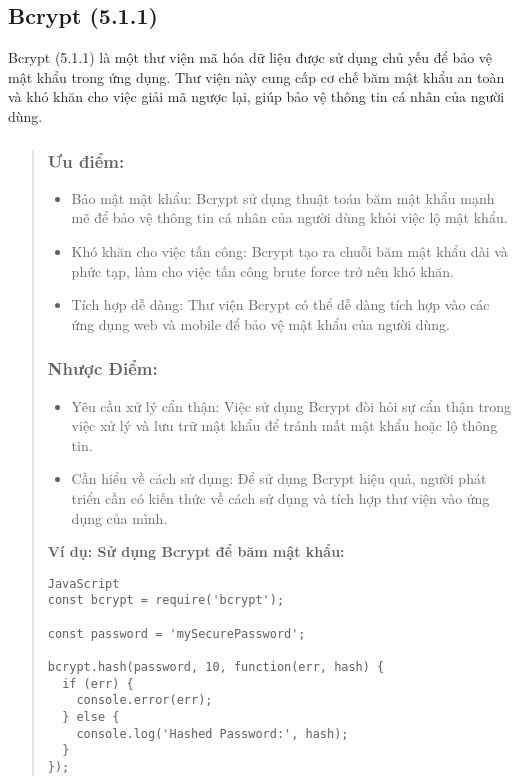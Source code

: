 \subsection{Bcrypt (5.1.1)}
Bcrypt (5.1.1) là một thư viện mã hóa dữ liệu được sử dụng chủ yếu để bảo vệ mật khẩu trong ứng dụng. Thư viện này cung cấp cơ chế băm mật khẩu an toàn và khó khăn cho việc giải mã ngược lại, giúp bảo vệ thông tin cá nhân của người dùng.

\begin{quote}
\subsubsection{Ưu điểm:}
\begin{itemize}
  \item Bảo mật mật khẩu: Bcrypt sử dụng thuật toán băm mật khẩu mạnh mẽ để bảo vệ thông tin cá nhân của người dùng khỏi việc lộ mật khẩu.
  \item Khó khăn cho việc tấn công: Bcrypt tạo ra chuỗi băm mật khẩu dài và phức tạp, làm cho việc tấn công brute force trở nên khó khăn.
  \item Tích hợp dễ dàng: Thư viện Bcrypt có thể dễ dàng tích hợp vào các ứng dụng web và mobile để bảo vệ mật khẩu của người dùng.
\end{itemize}

\subsubsection{Nhược Điểm:}
\begin{itemize}
  \item Yêu cầu xử lý cẩn thận: Việc sử dụng Bcrypt đòi hỏi sự cẩn thận trong việc xử lý và lưu trữ mật khẩu để tránh mất mật khẩu hoặc lộ thông tin.
  \item Cần hiểu về cách sử dụng: Để sử dụng Bcrypt hiệu quả, người phát triển cần có kiến thức về cách sử dụng và tích hợp thư viện vào ứng dụng của mình.
\end{itemize}

\textbf{Ví dụ: Sử dụng Bcrypt để băm mật khẩu:}
\begin{lstlisting}
JavaScript
const bcrypt = require('bcrypt');

const password = 'mySecurePassword';

bcrypt.hash(password, 10, function(err, hash) {
  if (err) {
    console.error(err);
  } else {
    console.log('Hashed Password:', hash);
  }
});
\end{lstlisting}
\end{quote}

